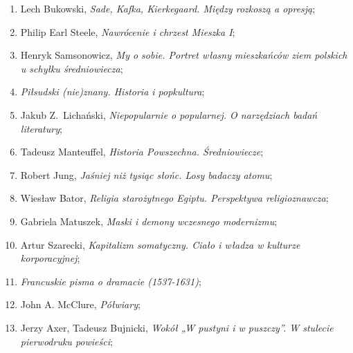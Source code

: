 \documentclass[a4paper,11pt]{article}
\begin{document}
\begin{enumerate}
\item Lech Bukowski, \textit{Sade, Kafka, Kierkegaard. Między rozkoszą a
    opresją};



\item Philip Earl Steele, \textit{Nawrócenie i chrzest Mieszka I};



\item Henryk Samsonowicz, \textit{My o sobie. Portret własny mieszkańców
    ziem polskich u schyłku średniowiecza};



\item \textit{Piłsudski (nie)znany. Historia i popkultura};



\item Jakub Z.~Lichański, \textit{Niepopularnie o popularnej. O
    narzędziach badań literatury};



\item Tadeusz Manteuffel, \textit{Historia Powszechna. Średniowiecze};



\item Robert Jung, \textit{Jaśniej niż tysiąc słońc. Losy badaczy
    atomu};



\item Wiesław Bator, \textit{Religia starożytnego Egiptu. Perspektywa
    religioznawcza};



\item Gabriela Matuszek, \textit{Maski i demony wczesnego modernizmu};



\item Artur Szarecki, \textit{Kapitalizm somatyczny. Ciało i władza w
    kulturze korporacyjnej};



\item \textit{Francuskie pisma o dramacie (1537-1631)};



\item John A. McClure, \textit{Półwiary};



\item Jerzy Axer, Tadeusz Bujnicki, \textit{Wokół „W pustyni i w
    puszczy”. W stulecie pierwodruku powieści};




\end{enumerate}
\end{document}
